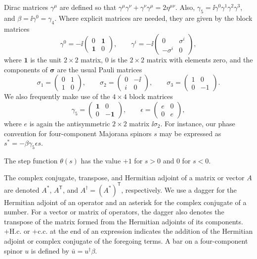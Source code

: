 Dirac matrices \(\gamma^\mu\) are defined so that
\(\gamma^\mu\gamma^\nu+\gamma^\nu\gamma^\mu=2\eta^{\mu\nu}\). Also,
\(\gamma_5=\ii\gamma^0\gamma^1\gamma^2\gamma^3\), and
\(\beta=\ii\gamma^0=\gamma_4\). Where explicit matrices are needed, they are
given by the block matrices
\[
  \gamma^0=-\ii
  \begin{pmatrix}
    0 & \mathbf{1}\\
    \mathbf{1} & 0
  \end{pmatrix},
  \qquad
  \gamma^i=-\ii
  \begin{pmatrix}
    0 & \sigma^i\\
    -\sigma^i & 0
  \end{pmatrix},
\]
where \(\mathbf{1}\) is the unit \(2\times2\) matrix, \(0\) is the
\(2\times2\) matrix with elements zero, and the components of \(\boldsymbol
\sigma\) are the usual Pauli matrices
\[
  \sigma_1=
  \begin{pmatrix}
    0 & 1\\
    1 & 0
  \end{pmatrix},
  \qquad
  \sigma_2=
  \begin{pmatrix}
    0 & -\ii\\
    i & 0
  \end{pmatrix},
  \qquad
  \sigma_3=
  \begin{pmatrix}
    1 & 0\\
    0 & -1
  \end{pmatrix}.
\]
We also frequently make use of the \(4\times4\) block matrices
\[
  \gamma_5=
  \begin{pmatrix}
    \mathbf{1} & 0\\
    0 & -\mathbf{1}
  \end{pmatrix},
  \qquad
  \epsilon=
  \begin{pmatrix}
    e & 0\\
    0 & e
  \end{pmatrix},
\]
where \(e\) is again the antisymmetric \(2\times2\) matrix \(\ii\sigma_2\).
For instance, our phase convention for four-component Majorana spinors \(s\)
may be expressed as \(s^*=-\beta\gamma_5\epsilon s\).

The step function \(\theta(s)\) has the value \(+1\) for \(s>0\) and \(0\) for
\(s<0\).

The complex conjugate, transpose, and Hermitian adjoint of a matrix or vector
\(A\) are denoted \(A^*\), \(A^{\mathsf T}\), and
\(A^\dagger=(A^*)^{\mathsf T}\), respectively. We use a dagger for the
Hermitian adjoint of an operator and an asterisk for the complex conjugate of a
number. For a vector or matrix of operators, the dagger also denotes the
transpose of the matrix formed from the Hermitian adjoints of its components.
\(+\mathrm{H.c.}\) or \(+\mathrm{c.c.}\) at the end of an expression indicates
the addition of the Hermitian adjoint or complex conjugate of the foregoing
terms. A bar on a four-component spinor \(u\) is defined by
\(\bar u=u^\dagger\beta\).

